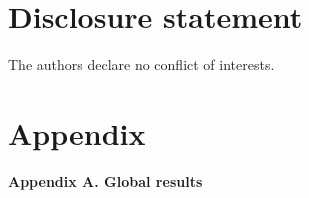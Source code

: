\documentclass[]{interact}
\theoremstyle{plain}%
\theoremstyle{definition}
\theoremstyle{remark}
\begin{document}


\section*{Disclosure statement}

The authors declare no conflict of interests.












\section{Appendix}

\noindent\textbf{Appendix A. Global results}\medskip
\end{document}
